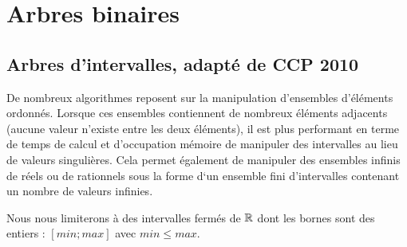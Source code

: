 
\def\numero{03}
\def\classe{Option info MP1}
\def\sep{\text{sep}}
\def\sur#1#2{${}^{\hbox{#1}}_{\hbox{#2}}$}
\def\sur#1#2{$\begin{matrix}\hbox{#1} \\ \hbox{#2}\end{matrix}$}


\camltrue

\chapter{Arbres binaires}
\section{Arbres d'intervalles, adapté de CCP 2010}
De nombreux algorithmes reposent sur la manipulation d'ensembles d'éléments ordonnés. Lorsque 
ces ensembles contiennent de nombreux éléments adjacents (aucune valeur n'existe entre les deux 
éléments), il est plus performant en terme de temps de calcul et d'occupation mémoire de manipuler 
des intervalles au lieu de valeurs singulières. Cela permet également de manipuler des ensembles 
infinis de réels ou de rationnels sous la forme d`un ensemble fini d'intervalles contenant un 
nombre de valeurs infinies.

Nous nous limiterons à des intervalles fermés de ${\mathbb R}$ dont les bornes 
sont des entiers : $[min; max]$ avec $min \le max$.
